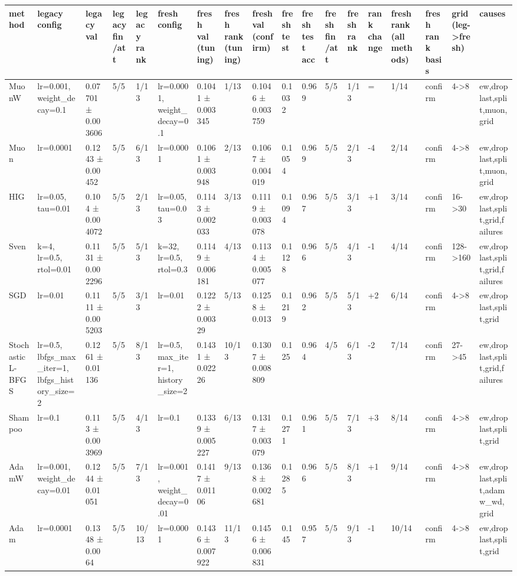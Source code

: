 \begin{tabular}{llllllllllllllllll}
\toprule
method & legacy config & legacy val & legacy fin/att & legacy rank & fresh config & fresh val (tuning) & fresh rank (tuning) & fresh val (confirm) & fresh test & fresh test acc & fresh fin/att & fresh rank & rank change & fresh rank (all methods) & fresh rank basis & grid (leg->fresh) & causes \\
\midrule
MuonW & lr=0.001, weight\_decay=0.1 & 0.07701 ± 0.003606 & 5/5 & 1/13 & lr=0.0001, weight\_decay=0.1 & 0.1041 ± 0.003345 & 1/13 & 0.1046 ± 0.003759 & 0.1032 & 0.969 & 5/5 & 1/13 & = & 1/14 & confirm & 4->8 & ew,droplast,split,muon,grid \\
Muon & lr=0.0001 & 0.1243 ± 0.00452 & 5/5 & 6/13 & lr=0.0001 & 0.1061 ± 0.003948 & 2/13 & 0.1067 ± 0.004019 & 0.1054 & 0.969 & 5/5 & 2/13 & -4 & 2/14 & confirm & 4->8 & ew,droplast,split,muon,grid \\
HIG & lr=0.05, tau=0.01 & 0.104 ± 0.004072 & 5/5 & 2/13 & lr=0.05, tau=0.03 & 0.1143 ± 0.002033 & 3/13 & 0.1119 ± 0.003078 & 0.1094 & 0.967 & 5/5 & 3/13 & +1 & 3/14 & confirm & 16->30 & ew,droplast,split,grid,failures \\
Sven & k=4, lr=0.5, rtol=0.01 & 0.1131 ± 0.002296 & 5/5 & 5/13 & k=32, lr=0.5, rtol=0.3 & 0.1149 ± 0.006181 & 4/13 & 0.1134 ± 0.005077 & 0.1128 & 0.966 & 5/5 & 4/13 & -1 & 4/14 & confirm & 128->160 & ew,droplast,split,grid,failures \\
SGD & lr=0.01 & 0.1111 ± 0.005203 & 5/5 & 3/13 & lr=0.01 & 0.1222 ± 0.00329 & 5/13 & 0.1258 ± 0.013 & 0.1219 & 0.962 & 5/5 & 5/13 & +2 & 6/14 & confirm & 4->8 & ew,droplast,split,grid \\
Stochastic L-BFGS & lr=0.5, lbfgs\_max\_iter=1, lbfgs\_history\_size=2 & 0.1261 ± 0.01136 & 5/5 & 8/13 & lr=0.5, max\_iter=1, history\_size=2 & 0.1431 ± 0.02226 & 10/13 & 0.1307 ± 0.008809 & 0.125 & 0.964 & 4/5 & 6/13 & -2 & 7/14 & confirm & 27->45 & ew,droplast,split,grid,failures \\
Shampoo & lr=0.1 & 0.113 ± 0.003969 & 5/5 & 4/13 & lr=0.1 & 0.1339 ± 0.005227 & 6/13 & 0.1317 ± 0.003079 & 0.1271 & 0.961 & 5/5 & 7/13 & +3 & 8/14 & confirm & 4->8 & ew,droplast,split,grid \\
AdamW & lr=0.001, weight\_decay=0.01 & 0.1244 ± 0.01051 & 5/5 & 7/13 & lr=0.001, weight\_decay=0.01 & 0.1417 ± 0.01106 & 9/13 & 0.1368 ± 0.002681 & 0.1285 & 0.966 & 5/5 & 8/13 & +1 & 9/14 & confirm & 4->8 & ew,droplast,split,adamw\_wd,grid \\
Adam & lr=0.0001 & 0.1348 ± 0.0064 & 5/5 & 10/13 & lr=0.0001 & 0.1436 ± 0.007922 & 11/13 & 0.1456 ± 0.006831 & 0.145 & 0.957 & 5/5 & 9/13 & -1 & 10/14 & confirm & 4->8 & ew,droplast,split,grid \\

\end{tabular}
